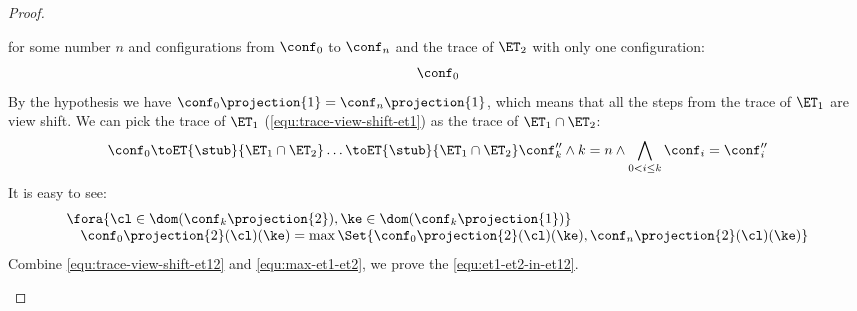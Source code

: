 \begin{proof}
\begin{itemize}
for some number \( n \) and configurations from \( \conf_0 \) to \( \conf_n \) and the trace of \( \ET_2 \) with only one configuration:
\begin{equation}
    \label{equ:trace-singleton-et2}
    \conf_0
\end{equation}
By the hypothesis we have \( \conf_0\projection{1} = \conf_n\projection{1} \), which means that all the steps from the trace of \( \ET_1 \) are view shift.
We can pick the trace of \( \ET_1 \) (\cref{equ:trace-view-shift-et1}) as the trace of \( \ET_1 \cap \ET_2 \):
\begin{equation}
    \label{equ:trace-view-shift-et12}
    \conf_0 \toET{\stub}{\ET_1 \cap \ET_2} \dots \toET{\stub}{\ET_1 \cap \ET_2} \conf''_k \land  k = n \land \bigwedge_{ 0 < i \leq k} \conf_i = \conf''_i
\end{equation}
It is easy to see:
\begin{equation}
    \label{equ:max-et1-et2}
    \begin{array}{l}
    \fora{\cl \in \dom(\conf_k\projection{2}), \ke \in \dom(\conf_k\projection{1})} \\
    \quad \conf_0\projection{2}(\cl)(\ke) = \max\Set{\conf_0\projection{2}(\cl)(\ke), \conf_n\projection{2}(\cl)(\ke)}
\end{array}
\end{equation}
Combine \cref{equ:trace-view-shift-et12} and \cref{equ:max-et1-et2}, we prove the \cref{equ:et1-et2-in-et12}.


\end{itemize}
\end{proof}
